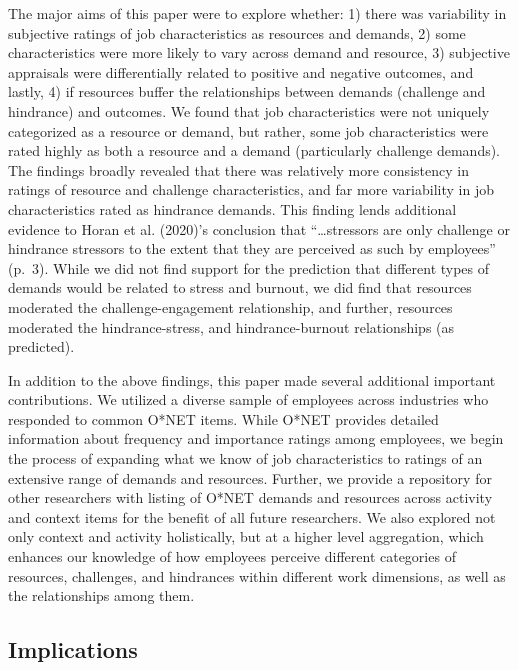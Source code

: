 \documentclass[
  man]{apa7}
\begin{document}
The major aims of this paper were to explore whether: 1) there was variability in subjective ratings of job characteristics as resources and demands, 2) some characteristics were more likely to vary across demand and resource, 3) subjective appraisals were differentially related to positive and negative outcomes, and lastly, 4) if resources buffer the relationships between demands (challenge and hindrance) and outcomes. We found that job characteristics were not uniquely categorized as a resource or demand, but rather, some job characteristics were rated highly as both a resource and a demand (particularly challenge demands). The findings broadly revealed that there was relatively more consistency in ratings of resource and challenge characteristics, and far more variability in job characteristics rated as hindrance demands. This finding lends additional evidence to Horan et al. (2020)'s conclusion that ``\ldots stressors are only challenge or hindrance stressors to the extent that they are perceived as such by employees'' (p.~3). While we did not find support for the prediction that different types of demands would be related to stress and burnout, we did find that resources moderated the challenge-engagement relationship, and further, resources moderated the hindrance-stress, and hindrance-burnout relationships (as predicted).

In addition to the above findings, this paper made several additional important contributions. We utilized a diverse sample of employees across industries who responded to common O*NET items. While O*NET provides detailed information about frequency and importance ratings among employees, we begin the process of expanding what we know of job characteristics to ratings of an extensive range of demands and resources. Further, we provide a repository for other researchers with listing of O*NET demands and resources across activity and context items for the benefit of all future researchers. We also explored not only context and activity holistically, but at a higher level aggregation, which enhances our knowledge of how employees perceive different categories of resources, challenges, and hindrances within different work dimensions, as well as the relationships among them.

\subsection{Implications}\label{implications}
\end{document}
